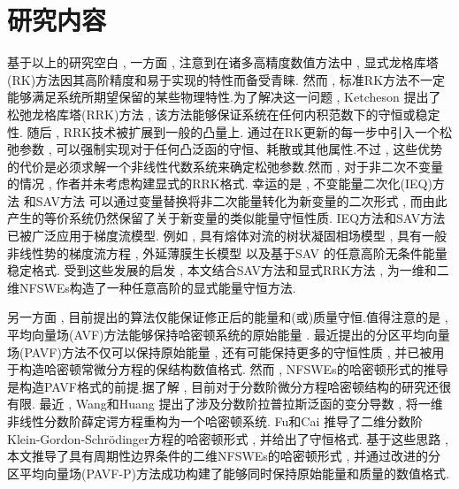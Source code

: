 \section{研究内容}
基于以上的研究空白 , 
一方面 , 注意到在诸多高精度数值方法中 , 显式龙格库塔(RK)方法因其高阶精度和易于实现的特性而备受青睐.
然而 , 标准RK方法不一定能够满足系统所期望保留的某些物理特性.为了解决这一问题 , Ketcheson \cite{ketchesonRelaxationRungeKutta2019} 提出了松弛龙格库塔(RRK)方法 , 该方法能够保证系统在任何内积范数下的守恒或稳定性.
随后 , RRK技术被扩展到一般的凸量上\cite{ranochaRelaxationRungeKutta2020}.
通过在RK更新的每一步中引入一个松弛参数 , 可以强制实现对于任何凸泛函的守恒、耗散或其他属性.不过 , 这些优势的代价是必须求解一个非线性代数系统来确定松弛参数.然而 , 对于非二次不变量的情况 , 作者并未考虑构建显式的RRK格式.
幸运的是 , 不变能量二次化(IEQ)方法 \cite{yangLinearUnconditionallyEnergy2017,yangEfficientLinearSchemes2017} 和SAV方法 \cite{chengConvergenceEnergyconservingScheme2022} 可以通过变量替换将非二次能量转化为新变量的二次形式 , 而由此产生的等价系统仍然保留了关于新变量的类似能量守恒性质.
IEQ方法和SAV方法已被广泛应用于梯度流模型\cite{zhaoNumericalApproximationsPhase2017,shenScalarAuxiliaryVariable2018,liuExponentialScalarAuxiliary2020,chengMultipleScalarAuxiliary2018}.
例如 , 具有熔体对流的树状凝固相场模型\cite{chenEfficientNumericalScheme2019} , 具有一般非线性势的梯度流方程\cite{yangConvergenceAnalysisInvariant2020} , 外延薄膜生长模型\cite{chengHighlyEfficientAccurate2019}
以及基于SAV 的任意高阶无条件能量稳定格式\cite{gongArbitrarilyHighorderUnconditionally2020}.
受到这些发展的启发 , 本文结合SAV方法和显式RRK方法 , 为一维和二维NFSWEs构造了一种任意高阶的显式能量守恒方法.

另一方面 , 目前提出的算法仅能保证修正后的能量和(或)质量守恒.值得注意的是 , 平均向量场(AVF)方法\cite{buddGeometricIntegrationUsing1999,quispelNewClassEnergypreserving2008}能够保持哈密顿系统的原始能量 . 
最近提出的分区平均向量场(PAVF)方法\cite{caiPartitionedAveragedVector2018}不仅可以保持原始能量 , 还有可能保持更多的守恒性质 , 并已被用于构造哈密顿常微分方程的保结构数值格式.
然而 , NFSWEs的哈密顿形式的推导是构造PAVF格式的前提.据了解 , 目前对于分数阶微分方程哈密顿结构的研究还很有限.
最近 , Wang和Huang \cite{wangStructurepreservingNumericalMethods2018} 提出了涉及分数阶拉普拉斯泛函的变分导数 , 将一维非线性分数阶薛定谔方程重构为一个哈密顿系统.
Fu和Cai \cite{fuStructurepreservingAlgorithmsTwodimensional2020} 推导了二维分数阶Klein-Gordon-Schr{\"o}dinger方程的哈密顿形式 , 并给出了守恒格式.
基于这些思路 , 本文推导了具有周期性边界条件的二维NFSWEs的哈密顿形式 , 并通过改进的分区平均向量场(PAVF-P)方法成功构建了能够同时保持原始能量和质量的数值格式.

